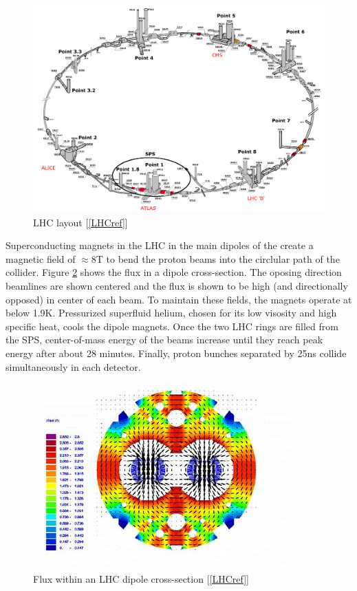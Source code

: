 \begin{figure}[!h]
        \centering
    \includegraphics[width=.6\textwidth]{Pictures/LHClayout.PNG}
    \caption{LHC layout [\ref{LHCref}]}
    \label{fig:LHClayout}
\end{figure}

Superconducting magnets in the LHC in the main dipoles of the create a magnetic field of $\approx 8$T to bend the proton beams into the circlular path of the collider. Figure \ref{fig:dipolemagnet} shows the flux in a dipole cross-section. The oposing direction beamlines are shown centered and the flux is shown to be high (and directionally opposed) in center of each beam. To maintain these fields, the magnets operate at below 1.9K. Pressurized superfluid helium, chosen for its low visosity and high specific heat, cools the dipole magnets. Once the two LHC rings are filled from the SPS, center-of-mass energy of the beams increase until they reach peak energy after about 28 minutes. Finally, proton bunches separated by 25ns collide simultaneously in each detector.  

\begin{figure}[!h]
        \centering
    \includegraphics[width=.6\textwidth]{Pictures/dipolemagnet.jpg}
    \caption{ Flux within an LHC dipole cross-section [\ref{LHCref}]}
    \label{fig:dipolemagnet}
\end{figure}

